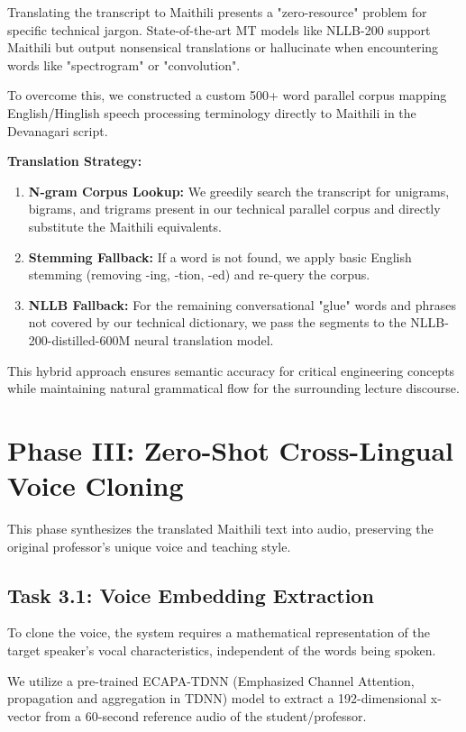 \documentclass[conference]{IEEEtran}
\begin{document}
Translating the transcript to Maithili presents a "zero-resource" problem for specific technical jargon. State-of-the-art MT models like NLLB-200 support Maithili but output nonsensical translations or hallucinate when encountering words like "spectrogram" or "convolution".

To overcome this, we constructed a custom 500+ word parallel corpus mapping English/Hinglish speech processing terminology directly to Maithili in the Devanagari script.

\textbf{Translation Strategy:}
\begin{enumerate}
    \item \textbf{N-gram Corpus Lookup:} We greedily search the transcript for unigrams, bigrams, and trigrams present in our technical parallel corpus and directly substitute the Maithili equivalents.
    \item \textbf{Stemming Fallback:} If a word is not found, we apply basic English stemming (removing -ing, -tion, -ed) and re-query the corpus.
    \item \textbf{NLLB Fallback:} For the remaining conversational "glue" words and phrases not covered by our technical dictionary, we pass the segments to the NLLB-200-distilled-600M neural translation model.
\end{enumerate}

This hybrid approach ensures semantic accuracy for critical engineering concepts while maintaining natural grammatical flow for the surrounding lecture discourse.

\section{Phase III: Zero-Shot Cross-Lingual Voice Cloning}

This phase synthesizes the translated Maithili text into audio, preserving the original professor's unique voice and teaching style.

\subsection{Task 3.1: Voice Embedding Extraction}

To clone the voice, the system requires a mathematical representation of the target speaker's vocal characteristics, independent of the words being spoken.

We utilize a pre-trained ECAPA-TDNN (Emphasized Channel Attention, propagation and aggregation in TDNN) model to extract a 192-dimensional x-vector from a 60-second reference audio of the student/professor. 
\end{document}
